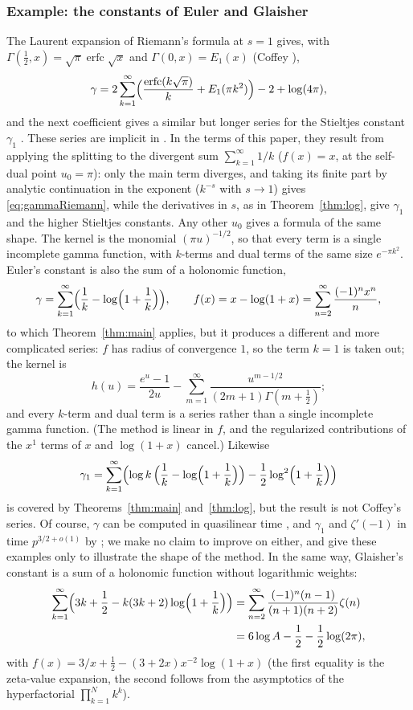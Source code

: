 \documentclass[11pt]{amsart}
\theoremstyle{definition}
\theoremstyle{remark}
\newcommand{\erfc}{\operatorname{erfc}}
\begin{document}
\subsubsection{Example: the constants of Euler and Glaisher}
The Laurent expansion of Riemann's formula at $s = 1$ gives, with $\Gamma(\frac12, x) = \sqrt\pi\erfc\sqrt x$ and
$\Gamma(0, x) = E_1(x)$ (Coffey \cite[Proposition~9]{Cof14}),
\begin{equation}\label{eq:gammaRiemann}
  \gamma = 2\sum_{k=1}^{\infty}\Bigl(\frac{\erfc(k\sqrt\pi)}{k} + E_1(\pi k^2)\Bigr) - 2 + \log(4\pi),
\end{equation}
and the next coefficient gives a similar but longer series for the Stieltjes constant $\gamma_1$ \cite[(1.22)]{Cof14}.
These series are implicit in \cite{Rie59}. In the terms of this paper, they result from applying the splitting
to the divergent sum $\sum_{k=1}^{\infty} 1/k$ ($f(x) = x$, at the self-dual point $u_0 = \pi$): only the main term diverges, and
taking its finite part by analytic continuation in the exponent ($k^{-s}$ with $s \to 1$) gives \eqref{eq:gammaRiemann},
while the derivatives in $s$, as in Theorem~\ref{thm:log}, give $\gamma_1$ and the higher Stieltjes constants. Any
other $u_0$ gives a formula of the same shape. The kernel is the monomial $(\pi u)^{-1/2}$, so that every term is a
single incomplete gamma function, with $k$-terms and dual terms of the same size $e^{-\pi k^2}$. Euler's constant is also the sum of a holonomic function,
\[
  \gamma = \sum_{k=1}^{\infty}\Bigl(\frac1k - \log\Bigl(1+\frac1k\Bigr)\Bigr), \qquad f(x) = x - \log(1+x) = \sum_{n=2}^{\infty}\frac{(-1)^nx^n}{n},
\]
to which Theorem~\ref{thm:main} applies, but it produces a different and more complicated series: $f$ has radius of
convergence $1$, so the term $k = 1$ is taken out; the kernel is
\[
  h(u) = \frac{e^u-1}{2u} - \sum_{m=1}^{\infty}\frac{u^{m-1/2}}{(2m+1)\Gamma(m+\frac12)};
\]
and every $k$-term and dual term is a series rather than a single incomplete gamma function. (The method is linear
in $f$, and the regularized contributions of the $x^1$ terms of $x$ and $\log(1+x)$ cancel.) Likewise
\[
  \gamma_1 = \sum_{k=1}^{\infty}\Bigl(\log k\,\Bigl(\frac1k - \log\Bigl(1+\frac1k\Bigr)\Bigr)
    - \frac12\log^2\Bigl(1+\frac1k\Bigr)\Bigr)
\]
is covered by Theorems~\ref{thm:main} and~\ref{thm:log}, but the result is not Coffey's series. Of course, $\gamma$ can be computed in
quasilinear time \cite{BM80}, and $\gamma_1$ and $\zeta'(-1)$ in time $p^{3/2+o(1)}$ by \cite{Joh21}; we make no
claim to improve on either, and give these examples only to illustrate the shape of the method. In the same way,
Glaisher's constant is a sum of a holonomic
function without logarithmic weights:
\begin{align*}
  \sum_{k=1}^{\infty}\Bigl(3k + \frac12 - k(3k+2)\log\Bigl(1+\frac1k\Bigr)\Bigr)
  &= \sum_{n=2}^{\infty}\frac{(-1)^n(n-1)}{(n+1)(n+2)}\zeta(n) \\
  &= 6\log A - \frac12 - \frac12\log(2\pi),
\end{align*}
with $f(x) = 3/x + \frac12 - (3+2x)x^{-2}\log(1+x)$ (the first equality is the zeta-value expansion, the second
follows from the asymptotics of the hyperfactorial $\prod_{k=1}^{N}k^k$).
\end{document}
